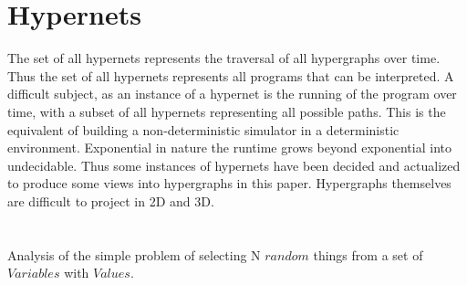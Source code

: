 
\section{Hypernets}
The set of all hypernets represents the traversal of all hypergraphs over time. Thus the set of all hypernets represents all programs that can be interpreted. A difficult subject, as an instance of a hypernet is the running of the program over time, with a subset of all hypernets representing all possible paths. This is the equivalent of building a non-deterministic simulator in a deterministic environment. Exponential in nature the runtime grows beyond exponential into undecidable. Thus some instances of hypernets have been decided and actualized to produce some views into hypergraphs in this paper. Hypergraphs themselves are difficult to project in 2D and 3D. 
\section{}
Analysis of the simple problem of selecting N $random$ things from a set of $Variables$ with $Values$. 
